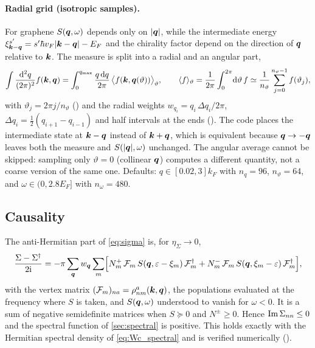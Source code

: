 \paragraph{Radial grid (isotropic samples).} For graphene $S(\bm q,\omega)$ depends only on $|\bm q|$, while the intermediate
energy $\xi^{s'}_{\bm k-\bm q}=s'\hbar v_F|\bm k-\bm q|-E_F$ and the chirality factor depend on the direction of $\bm q$ relative to
$\bm k$. The measure is split into a radial and an angular part,
\begin{equation}
\int\frac{\mathrm d^2q}{(2\pi)^2}f(\bm k,\bm q)=\int_0^{q_{\max}}\frac{q\,\mathrm d q}{2\pi}\,\bigl\langle f(\bm k,\bm q(\vartheta))\bigr\rangle_\vartheta,
\qquad\langle f\rangle_\vartheta=\frac1{2\pi}\int_0^{2\pi}\!\mathrm d\vartheta\,f\simeq\frac1{n_\vartheta}\sum_{j=0}^{n_\vartheta-1}f(\vartheta_j),
\label{eq:radial}
\end{equation}
with $\vartheta_j=2\pi j/n_\vartheta$ () and the radial weights $w_{q_i}=q_i\,\Delta q_i/2\pi$,
$\Delta q_i=\frac12(q_{i+1}-q_{i-1})$ and half intervals at the ends (). The code places
the intermediate state at $\bm k-\bm q$ instead of $\bm k+\bm q$, which is equivalent because $\bm q\to-\bm q$ leaves both the measure
and $S(|\bm q|,\omega)$ unchanged. The angular average cannot be skipped: sampling only $\vartheta=0$ (collinear $\bm q$)
computes a different quantity, not a coarse version of the same one. Defaults: $q\in[0.02,3]k_F$ with $n_q=96$,
$n_\vartheta=64$, and $\omega\in(0,2.8E_F]$ with $n_\omega=480$.

\subsection{Causality}
\label{sec:passivity}

The anti-Hermitian part of \cref{eq:sigma} is, for $\eta_\Sigma\to0$,
\begin{equation}
\frac{\Sigma-\Sigma^\dagger}{2\mathrm i}=-\pi\sum_{\bm q}w_{\bm q}\sum_m\Bigl[N^+_m\,\mathcal F_m\,S(\bm q,\varepsilon-\xi_m)\,\mathcal F_m^\dagger
+N^-_m\,\mathcal F_m\,S(\bm q,\xi_m-\varepsilon)\,\mathcal F_m^\dagger\Bigr],
\end{equation}
with the vertex matrix $(\mathcal F_m)_{na}=\rho^a_{nm}(\bm k,\bm q)$, the populations evaluated at the frequency where $S$ is
taken,
and $S(\bm q,\omega)$ understood to vanish for $\omega<0$. It is a sum of negative semidefinite matrices when
$S\succeq0$ and $N^\pm\ge0$. Hence $\operatorname{Im}\Sigma_{nn}\le0$ and the spectral function of \cref{sec:spectral} is positive. This
holds exactly with the Hermitian spectral density of \cref{eq:Wc_spectral} and is verified numerically
().

